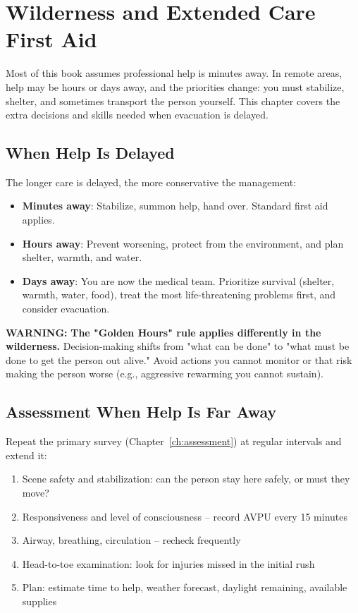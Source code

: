 \chapter{Wilderness and Extended Care First Aid}\label{ch:wilderness}

Most of this book assumes professional help is minutes away. In remote areas, help may be hours or days away, and the priorities change: you must stabilize, shelter, and sometimes transport the person yourself. This chapter covers the extra decisions and skills needed when evacuation is delayed.

\section{When Help Is Delayed}

The longer care is delayed, the more conservative the management:

\begin{itemize}[leftmargin=*]
  \item \textbf{Minutes away}: Stabilize, summon help, hand over. Standard first aid applies.
  \item \textbf{Hours away}: Prevent worsening, protect from the environment, and plan shelter, warmth, and water.
  \item \textbf{Days away}: You are now the medical team. Prioritize survival (shelter, warmth, water, food), treat the most life-threatening problems first, and consider evacuation.
\end{itemize}

\textbf{WARNING:} \textbf{The "Golden Hours" rule applies differently in the wilderness.} Decision-making shifts from "what can be done" to "what must be done to get the person out alive." Avoid actions you cannot monitor or that risk making the person worse (e.g., aggressive rewarming you cannot sustain).

\section{Assessment When Help Is Far Away}

Repeat the primary survey (Chapter~\ref{ch:assessment}) at regular intervals and extend it:

\begin{enumerate}[leftmargin=*]
\item Scene safety and stabilization: can the person stay here safely, or must they move?
\item Responsiveness and level of consciousness -- record AVPU every 15 minutes
\item Airway, breathing, circulation -- recheck frequently
\item Head-to-toe examination: look for injuries missed in the initial rush
\item Plan: estimate time to help, weather forecast, daylight remaining, available supplies
\end{enumerate}

